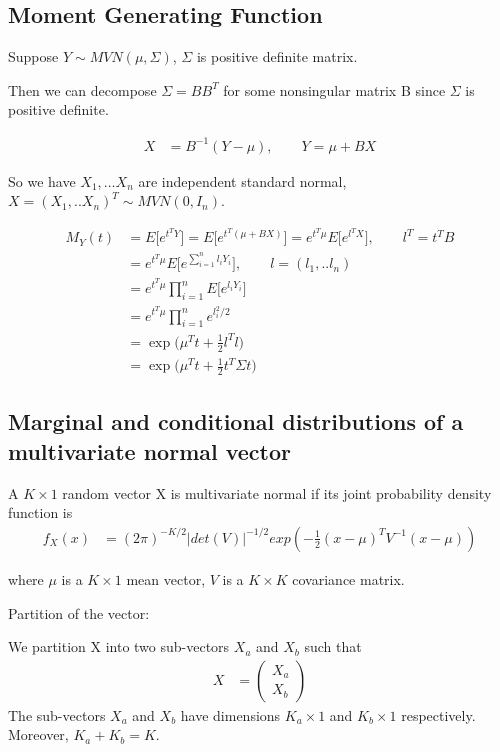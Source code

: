 \subsection{Moment Generating Function}

Suppose $Y \sim MVN(\mu, \Sigma)$, $\Sigma$ is positive definite matrix. 

Then we can decompose $\Sigma = B B^T$ for some nonsingular matrix B since $\Sigma$ is positive definite. 

 \begin{align*}
    X &= B^{-1} (Y- \mu), \qquad Y = \mu + B X 
\end{align*}

So we have $X_1, … X_n$ are independent standard normal, $X = (X_1,.. X_n)^T \sim MVN(0, I_n)$. 

 \begin{align*}
    M_Y(t) &=  E\Big[ e^{t^T Y}\Big ]=  E\Big[ e^{t^T (\mu + B X)}\Big ] = e^{t^T \mu} E \Big[ e^{l^T X} \Big], \qquad l^T = t^T B \\
    &= e^{t^T \mu} E \Big[ e^{\sum_{i=1}^n l_i Y_i} \Big], \qquad l= (l_1,.. l_n)\\
    &= e^{t^T \mu} \prod_{i=1}^n E \Big[ e^{ l_i Y_i} \Big] \\
    &= e^{t^T \mu} \prod_{i=1}^n e^{l_i^2/2}\\
    &= \exp \Big( \mu^T t + \frac{1}{2} l^T l \Big) \\
    &= \exp \Big( \mu^T t + \frac{1}{2} t^T \Sigma t \Big)
\end{align*}

 \subsection{Marginal and conditional distributions of a multivariate normal vector}

A $K \times 1$ random vector X is multivariate normal if its joint probability density function is 
\begin{align*}
	f_X(x) &= (2\pi)^{-K/2} |det(V)|^{-1/2} exp(-\frac{1}{2} (x-\mu)^T V^{-1}(x-\mu)) 
\end{align*}

where $\mu$ is a $K \times 1$ mean vector, $V$ is a $K \times K$ covariance matrix.

Partition of the vector:

 We partition X into two sub-vectors $X_a$ and $X_b$ such that
\begin{align*}
	X &= \begin{pmatrix}
		X_a \\
		X_b
	\end{pmatrix}
\end{align*}
The sub-vectors $X_a$ and $X_b$ have dimensions $K_a \times 1$ and $K_b \times 1$ respectively. Moreover, $K_a + K_b = K$.

